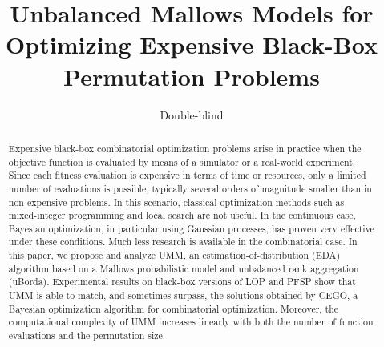 \documentclass[sigconf,dvipsnames]{acmart}
\begin{document}
\title{Unbalanced Mallows Models for Optimizing Expensive Black-Box Permutation Problems}
\author{Double-blind}

\begin{abstract}
  Expensive black-box combinatorial optimization problems arise in practice
  when the objective function is evaluated by means of a simulator or a
  real-world experiment. Since each fitness evaluation is expensive in terms of
  time or resources, only a limited number of evaluations is possible,
  typically several orders of magnitude smaller than in non-expensive problems. In
  this scenario, classical optimization methods such as mixed-integer
  programming and local search are not useful.  In the continuous case,
  Bayesian optimization, in particular using Gaussian processes, has proven
  very effective under these conditions. Much less research is available in the
  combinatorial case. In this paper, we propose and analyze UMM, an
  estimation-of-distribution (EDA) algorithm based on a Mallows probabilistic
  model and unbalanced rank aggregation (uBorda). Experimental results on
  black-box versions of LOP and PFSP show that UMM is able to match, and
  sometimes surpass, the solutions obtained by CEGO, a Bayesian optimization
  algorithm for combinatorial
  optimization. %
  Moreover, the computational complexity of UMM increases linearly with both
  the number of function evaluations and the permutation size.
  \sloppy
\end{abstract}
%
\end{document}
